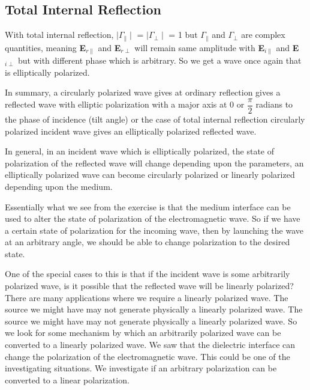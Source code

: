 \subsection{Total Internal Reflection}
With total internal reflection, $\mid\Gamma_\parallel\mid$ = $\mid\Gamma_\perp\mid$ = 1 but $\Gamma_\parallel$ and $\Gamma_\perp$ are complex quantities, meaning
\textbf{E}$_{r\parallel}$ and \textbf{E}$_{r\perp}$ will remain same amplitude with \textbf{E}$_{i\parallel}$ and \textbf{E}$_{i\perp}$ but with different phase which is arbitrary. So we get a wave once again that is elliptically polarized.

In summary, a circularly polarized wave gives at ordinary reflection gives a reflected wave with elliptic polarization with a major axis at 0 or $\dfrac{\pi}{2}$ radians to the phase of incidence (tilt angle) or the case of total internal reflection circularly polarized incident wave gives an elliptically polarized reflected wave.

In general, in an incident wave which is elliptically polarized, the state of polarization of the reflected wave will change depending upon the parameters, an elliptically polarized wave can become circularly polarized or linearly polarized depending upon the medium.

Essentially what we see from the exercise is that the medium interface can be used to alter the state of polarization of the electromagnetic wave. So if we have a certain state of polarization for the incoming wave, then by launching the wave at an arbitrary angle, we should be able to change polarization to the desired state.

One of the special cases to this is that if the incident wave is some arbitrarily polarized wave, is it possible that the reflected wave will be linearly polarized? There are many applications where we require a linearly polarized wave. The source we might have may not generate physically a linearly polarized wave. The source we might have may not generate physically a linearly polarized wave. So we look for some mechanism by which an arbitrarily polarized wave can be converted to a linearly polarized wave. We saw that the dielectric interface can change the polarization of the electromagnetic wave. This could be one of the investigating situations. We investigate if an arbitrary polarization can be converted to a linear polarization.

